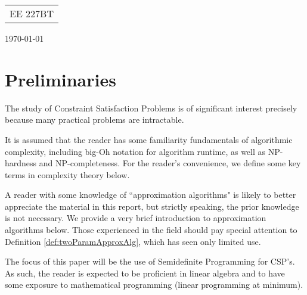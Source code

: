 \documentclass[12pt]{article}
\begin{document}
{\parindent 0pt \begin{tabular}[t]{l}
EE 227BT \\
\end{tabular}  \hfill \today \vskip 0.2in }

\parindent 0pt
\parskip 8pt

\section*{Preliminaries}

The study of Constraint Satisfaction Problems is of significant interest precisely because many practical problems are intractable.  

It is assumed that the reader has some familiarity fundamentals of algorithmic complexity, including big-Oh notation for algorithm runtime, as well as NP-hardness and NP-completeness. 
For the reader's convenience, we define some key terms in complexity theory below.

A reader with some knowledge of ``approximation algorithms" is likely to better appreciate the material in this report, but strictly speaking, the prior knowledge is not necessary. 
We provide a very brief introduction to approximation algorithms below. 
Those experienced in the field should pay special attention to Definition \ref{def:twoParamApproxAlg}, which has seen only limited use.

The focus of this paper will be the use of Semidefinite Programming for CSP's. As such, the reader is expected to be proficient in linear algebra and to have some exposure to mathematical programming (linear programming at minimum).
\end{document}
